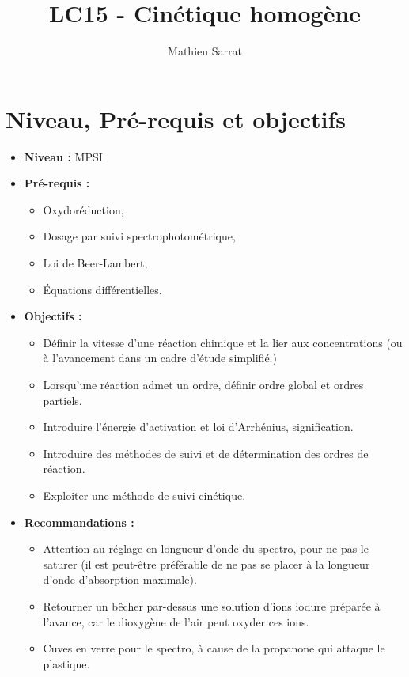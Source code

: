 \documentclass[11pt,a4paper]{report}
\author{Mathieu Sarrat}
\title{LC15 - Cinétique homogène}
\begin{document}
\maketitle

\section*{Niveau, Pré-requis et objectifs}
\begin{itemize}
	\item \textbf{Niveau :} MPSI\\
	
	\item \textbf{Pré-requis :}
	\begin{itemize}
		\item Oxydoréduction,
		\item Dosage par suivi spectrophotométrique,
		\item Loi de Beer-Lambert,
		\item Équations différentielles.\\
	\end{itemize}
	
	\item \textbf{Objectifs :}
	\begin{itemize}
		\item Définir la vitesse d'une réaction chimique et la lier aux concentrations (ou à 					l'avancement dans un cadre d'étude simplifié.)
		\item Lorsqu'une réaction admet un ordre, définir ordre global et ordres partiels.
		\item Introduire l'énergie d'activation et loi d'Arrhénius, signification. 
		\item Introduire des méthodes de suivi et de détermination des ordres de réaction.
		\item Exploiter une méthode de suivi cinétique.\\
	\end{itemize}
		
	\item \textbf{Recommandations :}
	\begin{itemize}
		\item Attention au réglage en longueur d'onde du spectro, pour ne pas le saturer (il est 				peut-être préférable de ne pas se placer à la longueur d'onde d'absorption maximale).
		\item Retourner un bêcher par-dessus une solution d'ions iodure préparée à l'avance, car le 			dioxygène de l'air peut oxyder ces ions.
		\item Cuves en verre pour le spectro, à cause de la propanone qui attaque le plastique.\\
	\end{itemize}
	

\end{itemize}
\end{document}

